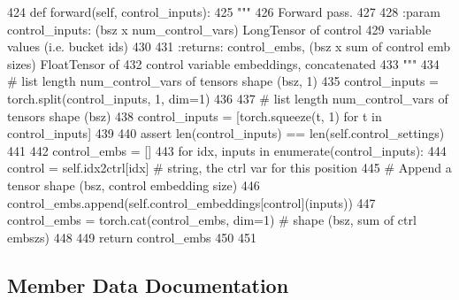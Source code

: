 \begin{DoxyCode}
424     \textcolor{keyword}{def }forward(self, control\_inputs):
425         \textcolor{stringliteral}{"""}
426 \textcolor{stringliteral}{        Forward pass.}
427 \textcolor{stringliteral}{}
428 \textcolor{stringliteral}{        :param control\_inputs: (bsz x num\_control\_vars) LongTensor of control}
429 \textcolor{stringliteral}{            variable values (i.e. bucket ids)}
430 \textcolor{stringliteral}{}
431 \textcolor{stringliteral}{        :returns: control\_embs, (bsz x sum of control emb sizes) FloatTensor of}
432 \textcolor{stringliteral}{            control variable embeddings, concatenated}
433 \textcolor{stringliteral}{        """}
434         \textcolor{comment}{# list length num\_control\_vars of tensors shape (bsz, 1)}
435         control\_inputs = torch.split(control\_inputs, 1, dim=1)
436 
437         \textcolor{comment}{# list length num\_control\_vars of tensors shape (bsz)}
438         control\_inputs = [torch.squeeze(t, 1) \textcolor{keywordflow}{for} t \textcolor{keywordflow}{in} control\_inputs]
439 
440         \textcolor{keyword}{assert} len(control\_inputs) == len(self.control\_settings)
441 
442         control\_embs = []
443         \textcolor{keywordflow}{for} idx, inputs \textcolor{keywordflow}{in} enumerate(control\_inputs):
444             control = self.idx2ctrl[idx]  \textcolor{comment}{# string, the ctrl var for this position}
445             \textcolor{comment}{# Append a tensor shape (bsz, control embedding size)}
446             control\_embs.append(self.control\_embeddings[control](inputs))
447         control\_embs = torch.cat(control\_embs, dim=1)  \textcolor{comment}{# shape (bsz, sum of ctrl embszs)}
448 
449         \textcolor{keywordflow}{return} control\_embs
450 
451 
\end{DoxyCode}


\subsection{Member Data Documentation}
\mbox{\label{classprojects_1_1controllable__dialogue_1_1controllable__seq2seq_1_1modules_1_1ControlEncoder_a4935c48c23d2a7d4fcddbdb32d8e9ce6}} 

